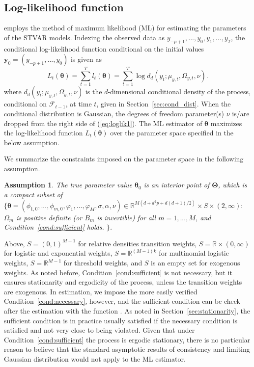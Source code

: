 \documentclass[nojss]{jss}
\newtheorem{assumption}{Assumption}
\begin{document}
\subsection{Log-likelihood function}\label{sec:loglik}
 employs the method of maximum likelihood (ML) for estimating the parameters of the STVAR models. Indexing the observed data as $y_{-p+1},...,y_0,y_1,...,y_T$, the conditional log-likelihood function conditional on the initial values $\boldsymbol{y}_0=(y_{-p+1},...,y_0)$ is given as
\begin{equation}\label{eq:loglik1}
L_t(\boldsymbol{\theta})=\sum_{t=1}^T l_t(\boldsymbol{\theta}) = \sum_{t=1}^T \log d_d(y_t;\mu_{y,t},\Omega_{y,t},\nu).
\end{equation}
where $d_d(y_t;\mu_{y,t},\Omega_{y,t},\nu)$ is the $d$-dimensional conditional density of the process, conditional on $\mathcal{F}_{t-1}$, at time $t$, given in Section~\ref{sec:cond_dist}. When the conditional distribution is Gaussian, the degrees of freedom parameter(s) $\nu$ is/are dropped from the right side of (\ref{eq:loglik1}). The ML estimator of $\boldsymbol{\theta}$ maximizes the log-likelihood function $L_t(\boldsymbol{\theta})$ over the parameter space specified in the below assumption.

We summarize the constraints imposed on the parameter space in the following assumption.
%
\begin{assumption}\label{as:mle}
The true parameter value $\boldsymbol{\theta}_0$ is an interior point of $\boldsymbol{\Theta}$, which is a compact subset of
$\lbrace \boldsymbol{\theta}=(\phi_{1,0},...,\phi_{m,0},\varphi_1,...,\varphi_M,\sigma,\alpha,\nu)\in\mathbb{R}^{M(d + d^2p + d(d+1)/2)}\times S\times (2,\infty):$ $\Omega_m$ is positive definite (or $B_m$ is invertible) for all $m=1,...,M$, and Condition~\ref{cond:sufficient} holds.
$\rbrace$.
\end{assumption}
%
Above, $S=(0,1)^{M-1}$ for relative densities transition weights, $S=\mathbb{R}\times (0,\infty)$ for logistic and exponential weights, $S=\mathbb{R}^{(M-1)k}$ for multinomial logistic weights, $S=\mathbb{R}^{M-1}$ for threshold weights, and $S$ is an empty set for exogenous weights. As noted before, Condition~\ref{cond:sufficient} is not necessary, but it ensures stationarity and ergodicity of the process, unless the transition weights are exogenous. In estimation, we impose the more easily verified Condition~\ref{cond:necessary}, however, and the sufficient condition can be check after the estimation with the function . As noted in Section~\ref{sec:stationarity}, the sufficient condition is in practice usually satisfied if the necessary condition is satisfied and not very close to being violated. Given that under Condition~\ref{cond:sufficient} the process is ergodic stationary, there is no particular reason to believe that the standard asymptotic results of consistency and limiting Gaussian distribution would not apply to the ML estimator.
\end{document}
